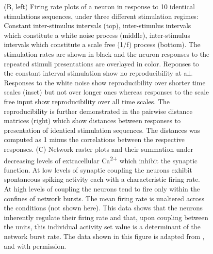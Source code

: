    \begin{figure}[!htb]
        \captionsetup{labelformat=adja-page}
        \ContinuedFloat
        \caption[]{(B, left) Firing rate plots of a neuron in response to 10 identical stimulations sequences, under three different stimulation regimes: Constant inter-stimulus intervals (top), inter-stimulus intervals which constitute a white noise process (middle), inter-stimulus intervals which constitute a scale free (1/f) process (bottom). The stimulation rates are shown in black and the neuron responses to the repeated stimuli presentations are overlayed in color. Reponses to the constant interval stimulation show no reproducibility at all. Responses to the white noise show reproducibility over shorter time scales (inset) but not over longer ones whereas responses to the scale free input show reproducibility over all time scales. The reproducibility is further demonstrated in the pairwise distance matrices (right) which show distances between responses to presentation of identical stimulation sequences. The distances was computed as 1 minus the correlations between the respective responses. (C) Network raster plots and their summation under decreasing levels of extracellular Ca\textsuperscript{2+} which inhibit the synaptic function. At low levels of synaptic coupling the neurons exhibit spontaneous spiking activity each with a characteristic firing rate. At high levels of coupling the neurons tend to fire only within the confines of network bursts. The mean firing rate is unaltered across the conditions (not shown here). This data shows that the neurons inherently regulate their firing rate and that, upon coupling between the units, this individual activity set value is a determinant of the network burst rate. The data shown in this figure is adapted from \cite{fong2015upward}, \cite{gal2013entrainment} and \cite{penn2016network} with permission.}

        \label{fig:introduction:MEAAch}
    \end{figure}

